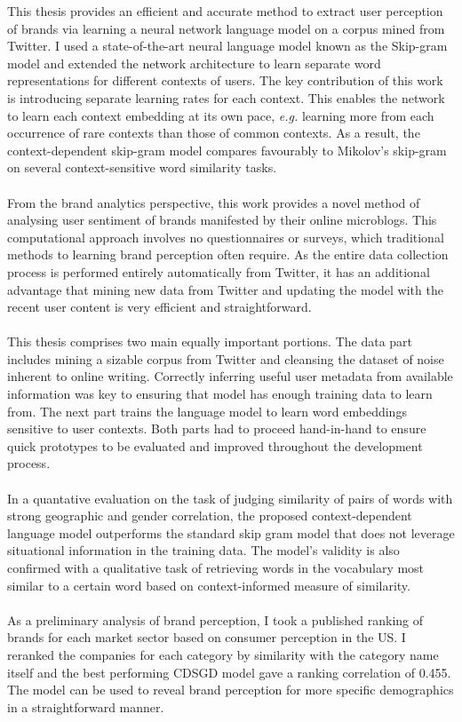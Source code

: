 \documentclass[a4paper,12pt,twoside,openright]{report}
\newcommand{\ti}{\textit}
\newcommand{\nl}{\\ \\}
\begin{document}
This thesis provides an efficient and accurate method to extract user perception of brands via learning a neural network language model on a corpus mined from Twitter. I used a state-of-the-art neural language model known as the Skip-gram model and extended the network architecture to learn separate word representations for different contexts of users. The key contribution of this work is introducing separate learning rates for each context. This enables the network to learn each context embedding at its own pace, \ti{e.g.} learning more from each occurrence of rare contexts than those of common contexts. As a result, the context-dependent skip-gram model compares favourably to Mikolov's skip-gram on several context-sensitive word similarity tasks. 
\nl
From the brand analytics perspective, this work provides a novel method of analysing user sentiment of brands manifested by their online microblogs. This computational approach involves no questionnaires or surveys, which traditional methods to learning brand perception often require. As the entire data collection process is performed entirely automatically from Twitter, it has an additional advantage that mining new data from Twitter and updating the model with the recent user content is very efficient and straightforward.
\nl
This thesis comprises two main equally important portions. The data part includes mining a sizable corpus from Twitter and cleansing the dataset of noise inherent to online writing. Correctly inferring useful user metadata from available information was key to ensuring that model has enough training data to learn from. The next part trains the language model to learn word embeddings sensitive to user contexts. Both parts had to proceed hand-in-hand to ensure quick prototypes to be evaluated and improved throughout the development process.
\nl
In a quantative evaluation on the task of judging similarity of pairs of words with strong geographic and gender correlation, the proposed context-dependent language model outperforms the standard skip gram model that does not leverage situational information in the training data. The model's validity is also confirmed with a qualitative task of retrieving words in the vocabulary most similar to a certain word based on context-informed measure of similarity. 
\nl
As a preliminary analysis of brand perception, I took a published ranking of brands for each market sector based on consumer perception in the US. I reranked the companies for each category by similarity with the category name itself and the best performing CDSGD model gave a ranking correlation of 0.455. The model can be used to reveal brand perception for more specific demographics in a straightforward manner.
\end{document}
